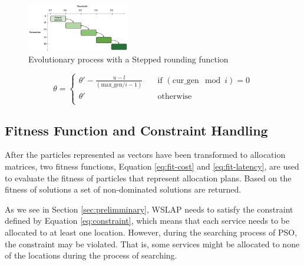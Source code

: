 \documentclass[10pt,journal,compsoc]{IEEEtran}
\begin{document}
\begin{figure}[H]
 \centering
   \includegraphics[width=0.4\textwidth]{pics/transfer.eps}
   \caption{Evolutionary process with a Stepped rounding function}
   \label{fig:adaptive}
 \end{figure}

\small
\begin{equation}
\label{eq:transfer}
  \theta =
  \begin{cases}
   \theta' - \frac{u - l}{(\text{max\_gen}/i - 1)} & \quad \text{if } (\text{cur\_gen}\mod i) = 0\\
   \theta' & \quad \text{otherwise} \\
  \end{cases}
\end{equation}
\normalsize

\vspace{-3 mm}
\subsection{Fitness Function and Constraint Handling}

After the particles represented as vectors have been transformed to allocation matrices, two fitness functions, Equation \ref{eq:fit-cost} and \ref{eq:fit-latency},  are used to evaluate the fitness of particles that represent allocation plans. Based on the fitness of solutions a set of non-dominated solutions are returned.

As we see in Section \ref{sec:prelimminary}, WSLAP needs to satisfy the constraint defined by Equation \ref{eq:constraint}, which means that each service needs to be allocated to at least one location. However, during the searching process of PSO, the constraint may be violated. That is, some services might be allocated to none of the locations during the process of searching.


\end{document}
